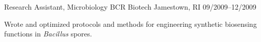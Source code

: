 \begin{cventries}
  \cventry
    {Research Assistant, Microbiology} %
    {BCR Biotech} %
    {Jamestown, RI} %
    {09/2009--12/2009} %
    {
      \begin{cvitems} %
        \item {Wrote and optimized protocols and methods for engineering synthetic biosensing functions in \textit{Bacillus} spores.}
      \end{cvitems}
    }

\end{cventries}
